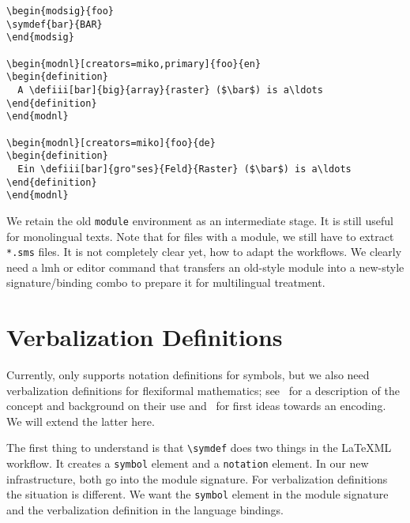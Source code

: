 \documentclass{bluenote}
\def\latexml{{\LaTeX}ML\xspace}
\def\lmh{\textsf{lmh}\xspace}
\def\lstomdoc{\lstinline[language={[1.3]OMDoc}]}
\begin{document}
\begin{lstlisting}[caption=New-Style \protect\sTeX,label=lst:newmods]
\begin{modsig}{foo}
\symdef{bar}{BAR}
\end{modsig}

\begin{modnl}[creators=miko,primary]{foo}{en}
\begin{definition}
  A \defiii[bar]{big}{array}{raster} ($\bar$) is a\ldots
\end{definition}
\end{modnl}

\begin{modnl}[creators=miko]{foo}{de}
\begin{definition}
  Ein \defiii[bar]{gro"ses}{Feld}{Raster} ($\bar$) is a\ldots
\end{definition}
\end{modnl}
\end{lstlisting}
We retain the old \lstinline|module| environment as an intermediate stage. It is still
useful for monolingual texts. Note that for files with a module, we still have to extract
\lstinline|*.sms| files. It is not completely clear yet, how to adapt the workflows. We
clearly need a \lmh or editor command that transfers an old-style module into a new-style
signature/binding combo to prepare it for multilingual treatment.

\section{Verbalization Definitions}

Currently, \sTeX only supports notation definitions for symbols, but we also need
verbalization definitions for flexiformal mathematics; see~\cite{Kohlhase:dmesmgm14} for a
description of the concept and background on their use and~\cite[section
5]{Kohlhase:dmsmglom14} for first ideas towards an \sTeX encoding. We will extend the
latter here.

The first thing to understand is that \lstinline|\symdef| does two things in the \latexml
workflow. It creates a \lstomdoc|symbol| element and a
\lstomdoc|notation| element. In our new infrastructure, both go into the module
signature. For verbalization definitions the situation is different. We want the
\lstomdoc|symbol| element in the module signature and the verbalization definition in the
language bindings.
\end{document}
